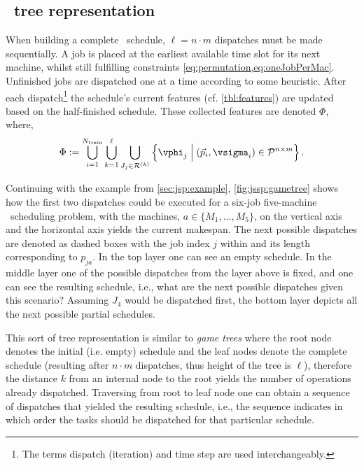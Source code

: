\subsection{\Jsp\ tree representation}\label{sec:gen:gametree}
When building a complete \jsp\ schedule, $\ell=n\cdot m$ dispatches must be made sequentially.
A job is placed at the earliest available time slot for its next machine, whilst still fulfilling constraints \cref{eq:permutation,eq:oneJobPerMac}.
Unfinished jobs are dispatched one at a time according to some heuristic. 
After each dispatch\footnote{The terms dispatch (iteration) and time step are used interchangeably.} the schedule's current features (cf. \cref{tbl:features}) are updated based on the half-finished schedule. 
These collected features are denoted $\Phi$, where, 
\begin{eqnarray}\label{eq:Phi}
\Phi:= \bigcup_{i=1}^{N_{\text{train}}} \bigcup_{k=1}^\ell\bigcup_{J_j\in\mathcal{R}^{(k)}} \left\{ \vphi_j  \;\Big|\; (\vec{p}_i,\vsigma_i)\in\mathcal{P}^{n\times m} \right\}.
\end{eqnarray}

Continuing with the example from \cref{sec:jsp:example}, \cref{fig:jssp:gametree} shows how the first two dispatches could be executed for a six-job five-machine \jsp\ scheduling problem, with the machines, $a\in\{M_1,...,M_5\}$, on the vertical axis and the horizontal axis yields the current makespan. The next possible dispatches are denoted as dashed boxes with the job index $j$ within and its length corresponding to $p_{ja}$.
In the top layer one can see an empty schedule.
In the middle layer one of the possible dispatches from the layer above is fixed, and one can see the resulting schedule, i.e., what are the next possible dispatches given this scenario? Assuming $J_4$ would be dispatched first, the bottom layer depicts all the next possible partial schedules.

This sort of tree representation is similar to \emph{game trees} \citep[cf.][]{Rosen03} where the root node denotes the initial (i.e. empty) schedule and the leaf nodes denote the complete schedule (resulting after $n\cdot m$ dispatches, thus height of the tree is $\ell$), therefore the distance $k$ from an internal node to the root yields the number of operations already dispatched. Traversing from root to leaf node one can obtain a sequence of dispatches that yielded the resulting schedule, i.e., the sequence indicates in which order the tasks should be dispatched for that particular schedule. 

